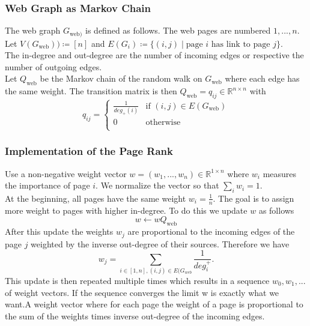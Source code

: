 \documentclass{panikzettel}
\begin{document}
\subsubsection{Web Graph as Markov Chain}
The web graph $G_{\text{web})}$ is defined as follows. The web pages are numbered $1,...,n$. Let $V(G_{\text{web}}))\coloneqq [n]$ and $E(G_i)\coloneqq \{(i,j) \mid \text{page } i \text{ has link to page } j\}$.\\
The in-degree and out-degree are the number of incoming edges or respective the number of outgoing edges.\\
Let $Q_{\text{web}}$ be the Markov chain of the random walk on $G_{\text{web}}$ where each edge has the same weight. The transition matrix is then $Q_{\text{web}}=q_{ij}\in\mathbb{R}^{n\times n}$  with
\[
q_{ij}=
\begin{cases}
\frac{1}{deg_{+}(i)} & \text{if }(i,j)\in E(G_{\text{web}})  \\
0 & \text{otherwise} \\
\end{cases}
\]

\subsubsection{Implementation of the Page Rank}
Use a non-negative weight vector $w=(w_1,...,w_n)\in\mathbb{R}^{1\times n}$ where $w_i$ measures the importance of page $i$. We normalize the vector so that $\sum_i w_i =1$.\\
At the beginning, all pages have the same weight $w_i=\frac{1}{n}$. The goal is to assign more weight to pages with higher in-degree. To do this we update $w$ as follows
\[
w \leftarrow wQ_{\text{web}}
\]
After this update the weights $w_j$ are proportional to the incoming edges of the page $j$ weighted by the inverse out-degree of their sources. Therefore we have
\[
w_j=\sum_{i\in [1,n], (i,j)\in E(G_{web}}\frac{1}{deg^{+}_i}.
\]
This update is then repeated multiple times which results in a sequence $w_0,w_1,...$ of weight vectors. If the sequence converges the limit w is exactly what we want.A weight vector where for each page the weight of a page is proportional to the sum of the weights times inverse out-degree of the incoming edges. 
\end{document}
